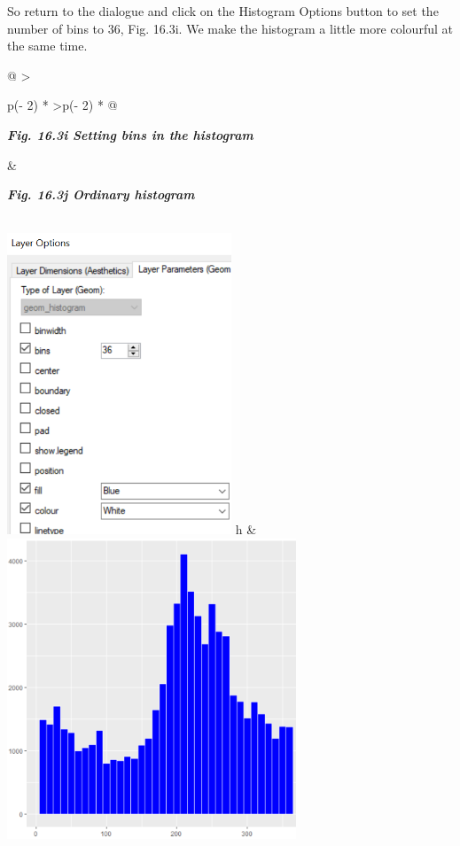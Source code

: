 \documentclass[
  letterpaper,
  DIV=11,
  numbers=noendperiod]{scrreprt}
\begin{document}
So return to the dialogue and click on the Histogram Options button to
set the number of bins to 36, Fig. 16.3i. We make the histogram a little
more colourful at the same time.

\begin{longtable}[]{@{}
  >{\raggedright\arraybackslash}p{(\columnwidth - 2\tabcolsep) * }
  >{\raggedleft\arraybackslash}p{(\columnwidth - 2\tabcolsep) * }@{}}
\toprule\noalign{}
\begin{minipage}[b]{\linewidth}\raggedright
\textbf{\emph{Fig. 16.3i Setting bins in the histogram}}
\end{minipage} & \begin{minipage}[b]{\linewidth}\raggedleft
\textbf{\emph{Fig. 16.3j Ordinary histogram}}
\end{minipage} \\
\midrule\noalign{}
\endhead
\bottomrule\noalign{}
\endlastfoot
\includegraphics[width=2.63703in,height=3.539in]{figures/Fig16.3i.png} h
&
\includegraphics[width=3.39483in,height=\textheight]{figures/Fig16.3j.png} \\
\end{longtable}
\end{document}
